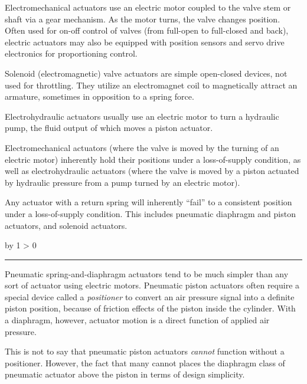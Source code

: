 \documentclass[12pt,a4paper]{article}
\def\notes{
           \advance\explnum by 1
           \ifnum \explnum > 0
                \hrule
                \vskip 3pt
                \leftline{Notes \the\explnum}
                \vskip 3pt \fi}
\begin{document}
\vskip 10pt

Electromechanical actuators use an electric motor coupled to the valve stem or shaft via a gear mechanism.  As the motor turns, the valve changes position.  Often used for on-off control of valves (from full-open to full-closed and back), electric actuators may also be equipped with position sensors and servo drive electronics for proportioning control.

\vskip 10pt

Solenoid (electromagnetic) valve actuators are simple open-closed devices, not used for throttling.  They utilize an electromagnet coil to magnetically attract an armature, sometimes in opposition to a spring force.

\vskip 10pt

Electrohydraulic actuators usually use an electric motor to turn a hydraulic pump, the fluid output of which moves a piston actuator.

\vskip 10pt

Electromechanical actuators (where the valve is moved by the turning of an electric motor) inherently hold their positions under a loss-of-supply condition, as well as electrohydraulic actuators (where the valve is moved by a piston actuated by hydraulic pressure from a pump turned by an electric motor).

\vskip 10pt

Any actuator with a return spring will inherently ``fail'' to a consistent position under a loss-of-supply condition.  This includes pneumatic diaphragm and piston actuators, and solenoid actuators.

\vskip 10pt \filbreak 





\notes{} 

Pneumatic spring-and-diaphragm actuators tend to be much simpler than any sort of actuator using electric motors.  Pneumatic piston actuators often require a special device called a {\it positioner} to convert an air pressure signal into a definite piston position, because of friction effects of the piston inside the cylinder.  With a diaphragm, however, actuator motion is a direct function of applied air pressure.

This is not to say that pneumatic piston actuators {\it cannot} function without a positioner.  However, the fact that many cannot places the diaphragm class of pneumatic actuator above the piston in terms of design simplicity.
\end{document}
